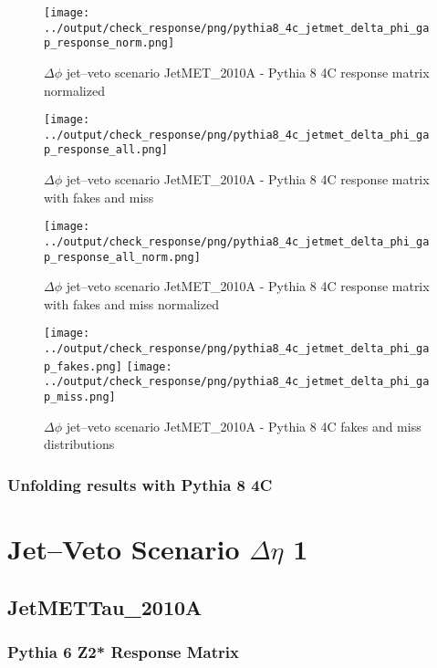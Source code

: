 \documentclass[11pt]{book}
\begin{document}
\begin{figure}[ht]
\centering
\texttt{[image: ../output/check\_response/png/pythia8\_4c\_jetmet\_delta\_phi\_gap\_response\_norm.png]}
\caption{$\Delta\phi$ jet--veto scenario JetMET\_2010A - Pythia 8 4C response matrix normalized}
\label{p8_jetmet_delta_phi_gap_response_norm}
\end{figure}

\begin{figure}[ht]
\centering
\texttt{[image: ../output/check\_response/png/pythia8\_4c\_jetmet\_delta\_phi\_gap\_response\_all.png]}
\caption{$\Delta\phi$ jet--veto scenario JetMET\_2010A - Pythia 8 4C response matrix with fakes and miss}
\label{p8_jetmet_delta_phi_gap_response_all}
\end{figure}

\begin{figure}[ht]
\centering
\texttt{[image: ../output/check\_response/png/pythia8\_4c\_jetmet\_delta\_phi\_gap\_response\_all\_norm.png]}
\caption{$\Delta\phi$ jet--veto scenario JetMET\_2010A - Pythia 8 4C response matrix with fakes and miss normalized}
\label{p8_jetmet_delta_phi_gap_response_all_norm}
\end{figure}

\begin{figure}[ht]
\centering
\texttt{[image: ../output/check\_response/png/pythia8\_4c\_jetmet\_delta\_phi\_gap\_fakes.png]}
\texttt{[image: ../output/check\_response/png/pythia8\_4c\_jetmet\_delta\_phi\_gap\_miss.png]}
\caption{$\Delta\phi$ jet--veto scenario JetMET\_2010A - Pythia 8 4C fakes and miss distributions}
\label{p8_jetmet_delta_phi_gap_fakesmiss}
\end{figure}


\clearpage
\subsection{Unfolding results with Pythia 8 4C}


\newpage
\chapter{Jet--Veto Scenario $\Delta\eta$ 1}
\section{JetMETTau\_2010A}
\subsection{Pythia 6 Z2* Response Matrix}
\end{document}
